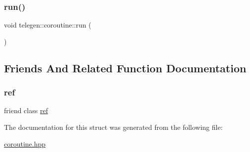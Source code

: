 \mbox{\label{structtelegen_1_1coroutine_a48b19e2ca54c0a7b63fe5c5f19620bcb}} 
\subsubsection{\texorpdfstring{run()}{run()}}
{\footnotesize\ttfamily void telegen\+::coroutine\+::run (\begin{DoxyParamCaption}{ }\end{DoxyParamCaption})\hspace{0.3cm}{\ttfamily [inline]}}



\subsection{Friends And Related Function Documentation}
\mbox{\label{structtelegen_1_1coroutine_aa3d603af636458056061ae4b08fe9c18}} 
\subsubsection{\texorpdfstring{ref}{ref}}
{\footnotesize\ttfamily friend class \hyperlink{classtelegen_1_1coroutine_1_1ref}{ref}\hspace{0.3cm}{\ttfamily [friend]}}



The documentation for this struct was generated from the following file\+:\begin{DoxyCompactItemize}
\item 
\hyperlink{coroutine_8hpp}{coroutine.\+hpp}\end{DoxyCompactItemize}
